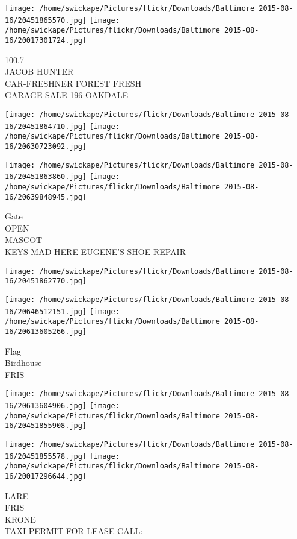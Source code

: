 \documentclass[10pt,letterpaper]{article}
\begin{document}
\texttt{[image: /home/swickape/Pictures/flickr/Downloads/Baltimore 2015-08-16/20451865570.jpg]}
\texttt{[image: /home/swickape/Pictures/flickr/Downloads/Baltimore 2015-08-16/20017301724.jpg]}

100.7\\
JACOB HUNTER\\
CAR{-}FRESHNER FOREST FRESH\\
GARAGE SALE 196 OAKDALE
\pagebreak

\texttt{[image: /home/swickape/Pictures/flickr/Downloads/Baltimore 2015-08-16/20451864710.jpg]}
\texttt{[image: /home/swickape/Pictures/flickr/Downloads/Baltimore 2015-08-16/20630723092.jpg]}

\texttt{[image: /home/swickape/Pictures/flickr/Downloads/Baltimore 2015-08-16/20451863860.jpg]}
\texttt{[image: /home/swickape/Pictures/flickr/Downloads/Baltimore 2015-08-16/20639848945.jpg]}

Gate\\
OPEN\\
MASCOT\\
KEYS MAD HERE EUGENE'S SHOE REPAIR
\pagebreak

\texttt{[image: /home/swickape/Pictures/flickr/Downloads/Baltimore 2015-08-16/20451862770.jpg]}

\vspace{0.25in}
\texttt{[image: /home/swickape/Pictures/flickr/Downloads/Baltimore 2015-08-16/20646512151.jpg]}
\texttt{[image: /home/swickape/Pictures/flickr/Downloads/Baltimore 2015-08-16/20613605266.jpg]}

Flag\\
Birdhouse\\
FRIS
\pagebreak

\texttt{[image: /home/swickape/Pictures/flickr/Downloads/Baltimore 2015-08-16/20613604906.jpg]}
\texttt{[image: /home/swickape/Pictures/flickr/Downloads/Baltimore 2015-08-16/20451855908.jpg]}

\texttt{[image: /home/swickape/Pictures/flickr/Downloads/Baltimore 2015-08-16/20451855578.jpg]}
\texttt{[image: /home/swickape/Pictures/flickr/Downloads/Baltimore 2015-08-16/20017296644.jpg]}

LARE\\
FRIS\\
KRONE\\
TAXI PERMIT FOR LEASE CALL:
\pagebreak
\end{document}
